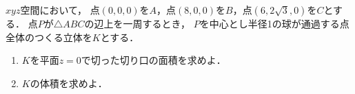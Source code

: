 \documentclass[../../main.tex]{subfiles}
\begin{document}
$xyz$空間において，
点$(0,0,0)$を$A$，点$(8,0,0)$を$B$，点$(6,2\sqrt3,0)$を$C$とする．
点$P$が$\triangle ABC$の辺上を一周するとき，
$P$を中心とし半径1の球が通過する点全体のつくる立体を$K$とする．
\begin{enumerate}
  \item $K$を平面$z=0$で切った切り口の面積を求めよ．
  \item $K$の体積を求めよ．
\end{enumerate}
\end{document}
